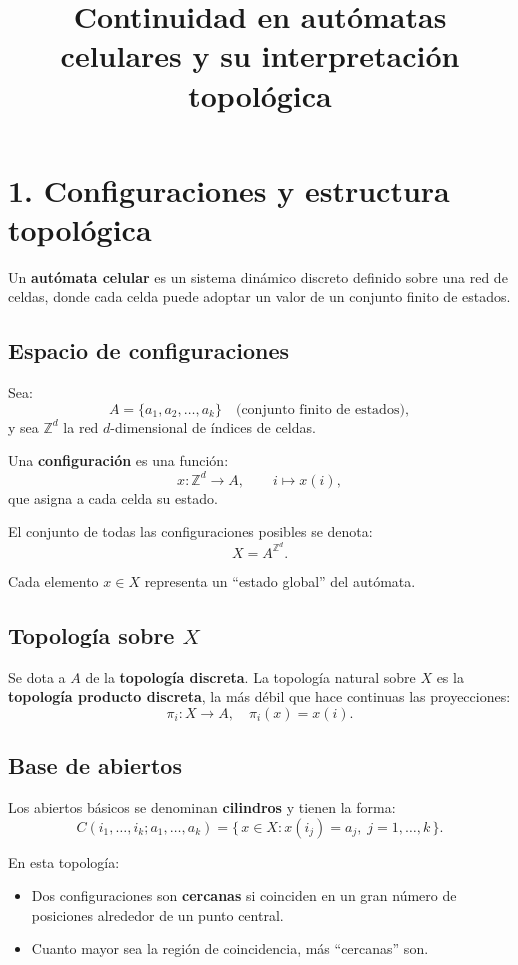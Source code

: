 \documentclass[12pt]{article}
\title{Continuidad en autómatas celulares y su interpretación topológica}
\author{}
\date{}
\begin{document}
\maketitle

\section*{1. Configuraciones y estructura topológica}

Un \textbf{autómata celular} es un sistema dinámico discreto definido sobre una red de celdas, donde cada celda puede adoptar un valor de un conjunto finito de estados.

\subsection*{Espacio de configuraciones}

Sea:
\[
A = \{a_1, a_2, \dots, a_k\} \quad \text{(conjunto finito de estados)},
\]
y sea $\mathbb{Z}^d$ la red $d$-dimensional de índices de celdas.

Una \textbf{configuración} es una función:
\[
x : \mathbb{Z}^d \longrightarrow A, \qquad i \longmapsto x(i),
\]
que asigna a cada celda su estado.

El conjunto de todas las configuraciones posibles se denota:
\[
X = A^{\mathbb{Z}^d}.
\]

Cada elemento $x \in X$ representa un ``estado global'' del autómata.

\subsection*{Topología sobre $X$}

Se dota a $A$ de la \textbf{topología discreta}.  
La topología natural sobre $X$ es la \textbf{topología producto discreta}, la más débil que hace continuas las proyecciones:
\[
\pi_i : X \to A, \quad \pi_i(x) = x(i).
\]

\subsection*{Base de abiertos}

Los abiertos básicos se denominan \textbf{cilindros} y tienen la forma:
\[
C(i_1, \dots, i_k; a_1, \dots, a_k)
= \{\, x \in X : x(i_j) = a_j,\; j=1,\dots,k \,\}.
\]

En esta topología:
\begin{itemize}
  \item Dos configuraciones son \textbf{cercanas} si coinciden en un gran número de posiciones alrededor de un punto central.
  \item Cuanto mayor sea la región de coincidencia, más ``cercanas'' son.
\end{itemize}
\end{document}
